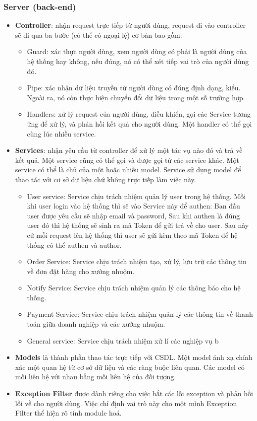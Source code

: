\subsubsection{Server (back-end)}
\begin{itemize}
    \item \textbf{Controller}: nhận request trực tiếp từ người dùng, request đi vào controller sẽ đi qua ba bước (có thể có ngoại lệ) cơ bản bao gồm:
    \begin{itemize}
        \item Guard: xác thực người dùng, xem người dùng có phải là người dùng của hệ thống hay không, nếu đúng, nó có thể xét tiếp vai trò của người dùng đó.
        \item Pipe: xác nhận dữ liệu truyền từ người dùng có đúng định dạng, kiểu. Ngoài ra, nó còn thực hiện chuyển đổi dữ liệu trong một số trường hợp.
        \item Handlers: xử lý request của người dùng, điều khiển, gọi các Service tương ứng để xử lý, và phản hồi kết quả cho người dùng. Một handler có thể gọi cùng lúc nhiều service.
    \end{itemize}
    
    \item \textbf{Services}: nhận yêu cầu từ controller để xử lý một tác vụ nào đó và trả về kết quả. Một service cũng có thể gọi và được gọi từ các service khác. Một service có thể là chủ của một hoặc nhiều model. Service sử dụng model để thao tác với cơ sở dữ liệu chứ không trực tiếp làm việc này.
    \begin{itemize}
        \item User service: Service chịu trách nhiệm quản lý user trong hệ thống. Mỗi khi user login vào hệ thống thì sẽ vào Service này để authen: Ban đầu user được yêu cầu sẽ nhập email và password, Sau khi authen là đúng user đó thì hệ thống sẽ sinh ra mã Token để gửi trả về cho user. Sau này cứ mỗi request lên hệ thống thì user sẽ gửi kèm theo mã Token để hệ thống có thể authen và author.
        \item Order Service: Service chịu trách nhiệm tạo, xử lý, lưu trữ các thông tin về đơn đặt hàng cho xưởng nhuộm.
        \item Notify Service: Service chịu trách nhiệm quản lý các thông báo cho hệ thống.
        \item Payment Service: Service chịu trách nhiệm quản lý các thông tin về thanh toán giữa doanh nghiệp và các xưởng nhuộm.
        \item General service: Service chịu trách nhiệm xử lí các nghiệp vụ b
    \end{itemize}
    
    \item \textbf{Models} là thành phần thao tác trực tiếp với CSDL. Một model ánh xạ chính xác một quan hệ từ cơ sở dữ liệu và các ràng buộc liên quan. Các model có mối liên hệ với nhau bằng mối liên hệ của đối tượng.
    
    \item \textbf{Exception Filter} được dành riêng cho việc bắt các lỗi exception và phản hồi lỗi về cho người dùng. Việc chỉ định vai trò này cho một mình Exception Filter thể hiện rõ tính module hoá.

\end{itemize}
